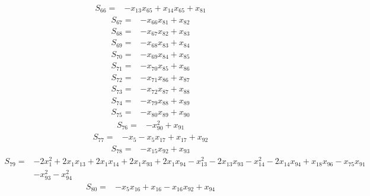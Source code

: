 \begin{align*}
S_{66}={}&-x_{13}x_{65}+x_{14}x_{65}+x_{81}
\end{align*}
\begin{align*}
S_{67}={}&-x_{66}x_{81}+x_{82}
\end{align*}
\begin{align*}
S_{68}={}&-x_{67}x_{82}+x_{83}
\end{align*}
\begin{align*}
S_{69}={}&-x_{68}x_{83}+x_{84}
\end{align*}
\begin{align*}
S_{70}={}&-x_{69}x_{84}+x_{85}
\end{align*}
\begin{align*}
S_{71}={}&-x_{70}x_{85}+x_{86}
\end{align*}
\begin{align*}
S_{72}={}&-x_{71}x_{86}+x_{87}
\end{align*}
\begin{align*}
S_{73}={}&-x_{72}x_{87}+x_{88}
\end{align*}
\begin{align*}
S_{74}={}&-x_{79}x_{88}+x_{89}
\end{align*}
\begin{align*}
S_{75}={}&-x_{80}x_{89}+x_{90}
\end{align*}
\begin{align*}
S_{76}={}&-x_{90}^{2}+x_{91}
\end{align*}
\begin{align*}
S_{77}={}&-x_{5}-x_{5}x_{17}+x_{17}+x_{92}
\end{align*}
\begin{align*}
S_{78}={}&-x_{15}x_{92}+x_{93}
\end{align*}
\begin{align*}
S_{79}={}&-2x_{1}^{2}+2x_{1}x_{13}+2x_{1}x_{14}+2x_{1}x_{93}+2x_{1}x_{94}-x_{13}^{2}-2x_{13}x_{93}-x_{14}^{2}-2x_{14}x_{94}+x_{18}x_{96}-x_{75}x_{91}\\
{}&-x_{93}^{2}-x_{94}^{2}
\end{align*}
\begin{align*}
S_{80}={}&-x_{5}x_{16}+x_{16}-x_{16}x_{92}+x_{94}
\end{align*}

